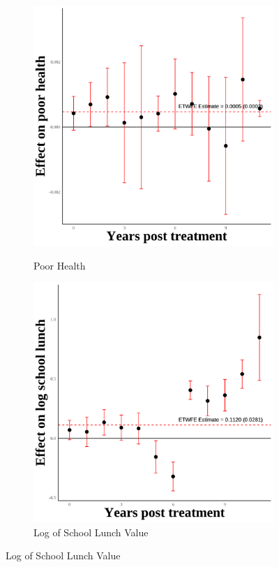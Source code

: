 \documentclass[12pt,english]{article}
\begin{document}
\pagebreak

\begin{figure}[H]
  \caption{Effect of Immigration Enforcement on Second Generation Outcomes: HW Parents}
  \centering

  \begin{subfigure}[b]{0.3\textwidth}
    \centering
    \caption{Poor Health}
    \includegraphics[width=\linewidth]{figures/plot34-poor_health_event_study-secgen-hw.png}
    \label{fig:poor-health-secgen-hw}
  \end{subfigure}
  \hfill
  \begin{subfigure}[b]{0.3\textwidth}
    \centering
    \caption{Log of School Lunch Value}
    \includegraphics[width=\linewidth]{figures/plot35-ln_schl_lunch_event_study-secgen-hw.png}

\end{subfigure}
\end{figure}
\end{document}

